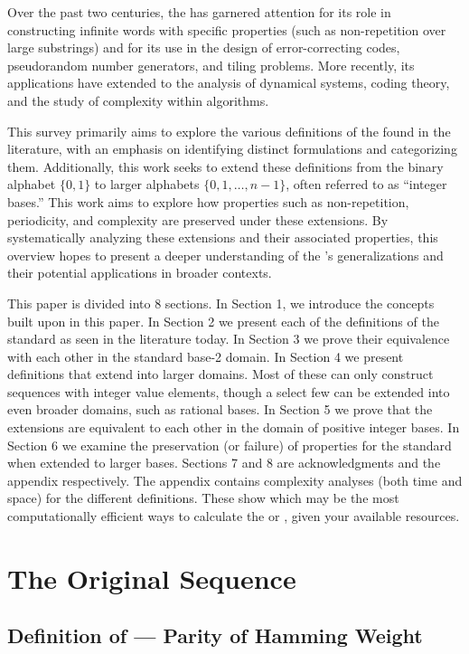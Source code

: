 \documentclass[conference]{IEEEtran}
\begin{document}
Over the past two centuries, the \TMS has garnered attention for its role in constructing infinite words with specific properties (such as non-repetition over large substrings) and for its use in the design of error-correcting codes, pseudorandom number generators, and tiling problems. More recently, its applications have extended to the analysis of dynamical systems, coding theory, and the study of complexity within algorithms.

This survey primarily aims to explore the various definitions of the \TMS found in the literature, with an emphasis on identifying distinct formulations and categorizing them. Additionally, this work seeks to extend these definitions from the binary alphabet $\{0,1\}$ to larger alphabets $\{0,1,\dots,n\!\!-\!\!1\}$, often referred to as ``integer bases.'' This work aims to explore how properties such as non-repetition, periodicity, and complexity are preserved under these extensions. By systematically analyzing these extensions and their associated properties, this overview hopes to present a deeper understanding of the \TMS's generalizations and their potential applications in broader contexts.

This paper is divided into 8 sections. In Section 1, we introduce the concepts built upon in this paper. In Section 2 we present each of the \TotalOriginals definitions of the standard \TMS as seen in the literature today. In Section 3 we prove their equivalence with each other in the standard base-2 domain. In Section 4 we present \TotalExtensions definitions that extend into larger domains. Most of these can only construct sequences with integer value elements, though a select few can be extended into even broader domains, such as rational bases. In Section 5 we prove that the extensions are equivalent to each other in the domain of positive integer bases. In Section 6 we examine the preservation (or failure) of properties for the standard \TMS when extended to larger bases. Sections 7 and 8 are acknowledgments and the appendix respectively. The appendix contains complexity analyses (both time and space) for the different definitions. These show which may be the most computationally efficient ways to calculate the \TMS or \ETMS, given your available resources.

\section{The Original Sequence}

\subsection{Definition  of \TotalOriginals\xspace --- Parity of Hamming Weight}
\end{document}
